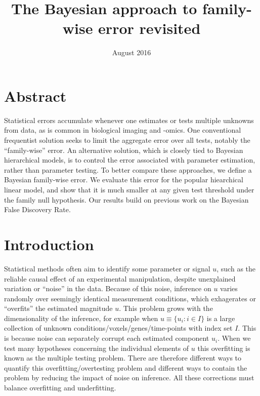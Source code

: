 \documentclass{article}
\title{The Bayesian approach to family-wise error revisited}
\date{August 2016}
\begin{document}
\maketitle


\section{Abstract}

Statistical errors accumulate whenever one estimates or tests multiple unknowns from data, as is common in biological imaging and -omics. One conventional frequentist solution seeks to limit the aggregate error over all tests, notably the ``family-wise'' error. An alternative solution, which is closely tied to Bayesian hierarchical models, is to control the error associated with parameter estimation, rather than parameter testing. To better compare these approaches, we define a Bayesian family-wise error. We evaluate this error for the popular hiearchical linear model, and show that it is much smaller at any given test threshold under the family null hypothesis. Our results build on previous work on the Bayesian False Discovery Rate.

\section{Introduction}

Statistical methods often aim to identify some parameter or signal $u$, such as the reliable causal effect of an experimental manipulation, despite unexplained variation or ``noise'' in the data. Because of this noise, inference on $u$ varies randomly over seemingly identical measurement conditions, which exhagerates or ``overfits'' the estimated magnitude $u$. This problem grows with the dimensionality of the inference, for example when $u \equiv \{u_i: i \in I \}$ is a large collection of unknown conditions/voxels/genes/time-points with index set $I$. This is because noise can separately corrupt each estimated component $u_i$. When we test many hypotheses concerning the individual elements of $u$ this overfitting is known as the multiple testing problem. There are therefore different ways to quantify this overfitting/overtesting problem and different ways to contain the problem by reducing the impact of noise on inference. All these corrections must balance overfitting and underfitting.
\end{document}
